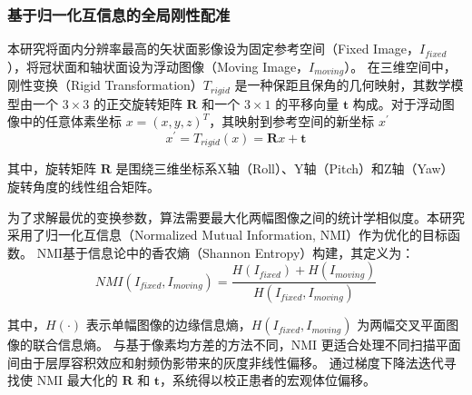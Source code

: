     \subsubsection{基于归一化互信息的全局刚性配准}
      本研究将面内分辨率最高的矢状面影像设为固定参考空间（Fixed Image，$I_{fixed}$），将冠状面和轴状面设为浮动图像（Moving Image，$I_{moving}$）。
      在三维空间中，刚性变换（Rigid Transformation）$T_{rigid}$ 是一种保距且保角的几何映射，其数学模型由一个 $3\times 3$ 的正交旋转矩阵 $\mathbf{R}$ 和一个 $3\times 1$ 的平移向量 $\mathbf{t}$ 构成。对于浮动图像中的任意体素坐标 $x=\left(x,y,z\right)^T$，其映射到参考空间的新坐标 $x^\prime$
      \begin{equation}
        x^\prime = T_{rigid}(x) = \mathbf{R}x + \mathbf{t}
      \end{equation}
      \par 其中，旋转矩阵 $\mathbf{R}$ 是围绕三维坐标系X轴（Roll）、Y轴（Pitch）和Z轴（Yaw）旋转角度的线性组合矩阵。
      \par 为了求解最优的变换参数，算法需要最大化两幅图像之间的统计学相似度。本研究采用了归一化互信息（Normalized Mutual Information, NMI）作为优化的目标函数。
      NMI基于信息论中的香农熵（Shannon Entropy）构建，其定义为：
      \begin{equation}
        NMI(I_{fixed}, I_{moving}) = \frac{H(I_{fixed}) + H(I_{moving})}{H(I_{fixed}, I_{moving})}
      \end{equation}
      \par 其中，$H\left(\cdot\right)$ 表示单幅图像的边缘信息熵，$H\left(I_{fixed},I_{moving}\right)$ 为两幅交叉平面图像的联合信息熵。
      与基于像素均方差的方法不同，NMI 更适合处理不同扫描平面间由于层厚容积效应和射频伪影带来的灰度非线性偏移。
      通过梯度下降法迭代寻找使 NMI 最大化的 $\mathbf{R}$ 和 $\mathbf{t}$，系统得以校正患者的宏观体位偏移。
